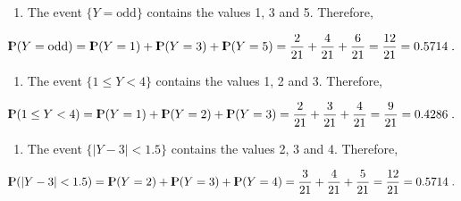 \documentclass[]{krantz}
\providecommand{\tightlist}{%
  \setlength{\itemsep}{0pt}\setlength{\parskip}{0pt}}
\newcommand{\Prob}{{\rm I\kern-.3em P}}
\theoremstyle{definition}
\theoremstyle{definition}
\theoremstyle{definition}
\theoremstyle{remark}
\begin{document}
\begin{enumerate}
\def\labelenumi{\arabic{enumi}.}
\setcounter{enumi}{2}
\tightlist
\item
  The event \(\{Y = \mbox{odd}\}\)
  contains the values 1, 3 and 5. Therefore,
\end{enumerate}

\[\Prob(Y = \mbox{odd}) = \Prob(Y=1) + \Prob(Y=3) + \Prob(Y=5) = \frac{2}{21} + \frac{4}{21} + \frac{6}{21} = \frac{12}{21}= 0.5714\;.\]

\begin{enumerate}
\def\labelenumi{\arabic{enumi}.}
\setcounter{enumi}{3}
\tightlist
\item
  The event \(\{1 \leq Y < 4\}\)
  contains the values 1, 2 and 3. Therefore,
\end{enumerate}

\[\Prob(1 \leq Y < 4) = \Prob(Y=1) + \Prob(Y=2) + \Prob(Y=3) = \frac{2}{21} + \frac{3}{21} + \frac{4}{21} = \frac{9}{21}= 0.4286\;.\]

\begin{enumerate}
\def\labelenumi{\arabic{enumi}.}
\setcounter{enumi}{4}
\tightlist
\item
  The event \(\{|Y -3| < 1.5\}\)
  contains the values 2, 3 and 4. Therefore,
\end{enumerate}

\[\Prob(|Y -3| < 1.5) = \Prob(Y=2) + \Prob(Y=3) + \Prob(Y=4) = \frac{3}{21} + \frac{4}{21} + \frac{5}{21} = \frac{12}{21}= 0.5714\;.\]
\end{document}

